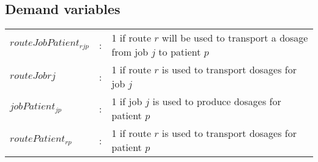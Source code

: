 \subsection{Demand variables}

\begin{tabular}{p{15mm}lp{105mm}}
    $routeJobPatient_{rjp}$    & : & 1 if route $r$ will be used to transport a dosage from job $j$ to patient $p$ \\  
    $routeJob{rj}$    & : & 1 if route $r$ is used to transport dosages for job $j$ \\  
    $jobPatient_{jp}$    & : & 1 if job $j$ is used to produce dosages for patient $p$ \\  
    $routePatient_{rp}$    & : & 1 if route $r$ is used to transport dosages for patient $p$\\
\end{tabular}
\bigskip


